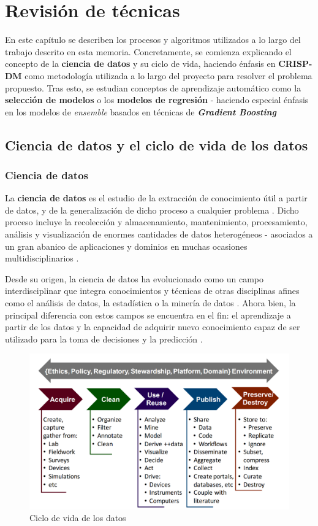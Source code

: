 \chapter{Revisión de técnicas}

En este capítulo se describen los procesos y algoritmos utilizados a lo largo del trabajo descrito en esta memoria. Concretamente, se comienza explicando el concepto de la \textbf{ciencia de datos} y su ciclo de vida, haciendo énfasis en \textbf{CRISP-DM} como metodología utilizada a lo largo del proyecto para resolver el problema propuesto. Tras esto, se estudian conceptos de aprendizaje automático como la \textbf{selección de modelos} o los \textbf{modelos de regresión} - haciendo especial énfasis en los modelos de \textit{ensemble} basados en técnicas de \textbf{\textit{Gradient Boosting}}


\section{Ciencia de datos y el ciclo de vida de los datos}

\subsection{Ciencia de datos}

La \textbf{ciencia de datos} es el estudio de la extracción de conocimiento útil a partir de datos, y de la generalización de dicho proceso a cualquier problema \cite{Donoho02102017}. Dicho proceso incluye la recolección y almacenamiento, mantenimiento, procesamiento, análisis y visualización de enormes cantidades de datos heterogéneos - asociados a un gran abanico de aplicaciones y dominios en muchas ocasiones multidisciplinarios \cite{10.1145/2500499}.

Desde su origen, la ciencia de datos ha evolucionado como un campo interdisciplinar que integra conocimientos y técnicas de otras disciplinas afines como el análisis de datos, la estadística o la minería de datos \cite{potential}. Ahora bien, la principal diferencia con estos campos se encuentra en el fin: el aprendizaje a partir de los datos \cite{Donoho02102017} y la capacidad de adquirir nuevo conocimiento capaz de ser utilizado para la toma de decisiones y la predicción \cite{10.1145/2500499}.

\begin{figure}[h]
	\centering
	\includegraphics[width=0.8\linewidth]{figs/chapter2/datalifecycle}
	\caption{Ciclo de vida de los datos \cite{potential}}
	\label{fig:datalifecycle}
\end{figure}

